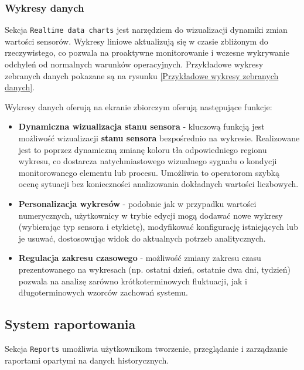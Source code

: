 \subsubsection{Wykresy danych}
Sekcja \texttt{Realtime data charts} jest narzędziem do wizualizacji dynamiki zmian wartości sensorów. Wykresy liniowe aktualizują się w czasie zbliżonym do rzeczywistego, co pozwala na proaktywne monitorowanie i wczesne wykrywanie odchyleń od normalnych warunków operacyjnych. Przykładowe wykresy zebranych danych pokazane są na rysunku \ref{Przykładowe wykresy zebranych danych}.

\vspace{0.3em}

Wykresy danych oferują na ekranie zbiorczym oferują następujące funkcje:

\begin{itemize}
    \item \textbf{Dynamiczna wizualizacja stanu sensora} - kluczową funkcją jest możliwość wizualizacji \textbf{stanu sensora} bezpośrednio na wykresie. Realizowane jest to poprzez dynamiczną zmianę koloru tła odpowiedniego regionu wykresu, co dostarcza natychmiastowego wizualnego sygnału o kondycji monitorowanego elementu lub procesu. Umożliwia to operatorom szybką ocenę sytuacji bez konieczności analizowania dokładnych wartości liczbowych.
    \item \textbf{Personalizacja wykresów} - podobnie jak w przypadku wartości numerycznych, użytkownicy w trybie edycji mogą dodawać nowe wykresy (wybierając typ sensora i etykietę), modyfikować konfigurację istniejących lub je usuwać, dostosowując widok do aktualnych potrzeb analitycznych.
    \item \textbf{Regulacja zakresu czasowego} - możliwość zmiany zakresu czasu prezentowanego na wykresach (np. ostatni dzień, ostatnie dwa dni, tydzień) pozwala na analizę zarówno krótkoterminowych fluktuacji, jak i długoterminowych wzorców zachowań systemu.
\end{itemize}


\newpage

\subsection{System raportowania}
Sekcja \texttt{Reports} umożliwia użytkownikom tworzenie, przeglądanie i zarządzanie raportami opartymi na danych historycznych.


